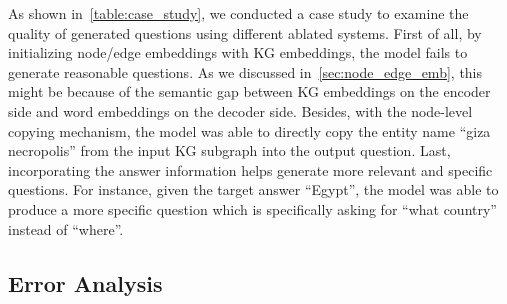 \documentclass[journal]{IEEEtran}
\begin{document}
As shown in~\cref{table:case_study},
we conducted a case study to examine the quality of generated questions using different ablated systems.
First of all, by initializing node/edge embeddings with KG embeddings, the model fails to generate reasonable questions.
As we discussed in~\cref{sec:node_edge_emb}, this might be because of the semantic gap between KG embeddings on the encoder side and word embeddings on the decoder side.
Besides,
with the node-level copying mechanism,
the model was able to directly copy the entity name ``giza necropolis'' from the input KG subgraph into the output question.
Last, incorporating the answer information helps generate more relevant and specific questions. For instance, given the target answer ``Egypt'', the model was able to produce a more specific question which is specifically asking for ``what country'' instead of ``where''.



\subsection{Error Analysis}
\end{document}
